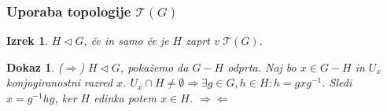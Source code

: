 \documentclass{beamer}
\newtheorem{izrek}{Izrek}
\newtheorem{dokaz}{Dokaz}
\begin{document}




\begin{frame}
\frametitle{Uporaba topologije $\mathcal{T}(G)$}

\begin{izrek}
    $H \triangleleft G$, če in samo če je $H$ zaprt v $\mathcal{T}(G)$.
    \pause
\end{izrek}

\begin{dokaz}
    ($\Rightarrow$)
    $H \triangleleft G$, pokažemo da $G - H$ odprta.
    \newline
    \pause
    Naj bo $x \in G - H$ in $U_x$ konjugiranostni razred $x$.
    \newline
    \pause
    $U_x \cap H \neq \emptyset \Rightarrow \exists g \in G, h \in H: h = gxg^{-1}$.
    \newline
    \pause
    Sledi $x = g^{-1}hg$, ker $H$ edinka potem $x \in H$.     
    \pause
    $\Rightarrow\!\Leftarrow$
\end{dokaz}

\end{frame}
\end{document}
